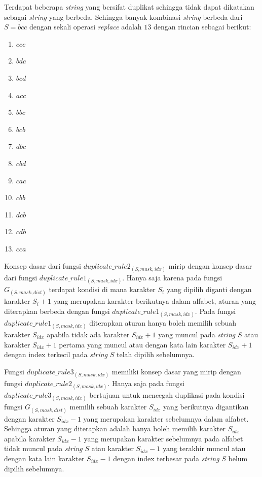 Terdapat beberapa \textit{string} yang bersifat duplikat sehingga tidak dapat dikatakan sebagai \textit{string} yang berbeda. Sehingga banyak kombinasi \textit{string} berbeda dari $ S=bcc $ dengan sekali operasi \textit{replace} adalah $ 13 $ dengan rincian sebagai berikut:
\begin{enumerate}
	\item $ ccc $
	\item $ bdc $
	\item $ bcd $
	\item $ acc $
	\item $ bbc $
	\item $ bcb $	
	\item $ dbc $	
	\item $ cbd $
	\item $ cac $
	\item $ cbb $	
	\item $ dcb $
	\item $ cdb $	
	\item $ cca $
\end{enumerate}

Konsep dasar dari fungsi $ duplicate\_rule2_{(S, mask, idx)} $ mirip dengan konsep dasar dari fungsi $ duplicate\_rule1_{(S, mask, idx)} $. Hanya saja karena pada fungsi $ G_{(S, mask, dist)} $ terdapat kondisi di mana karakter $ S_{i} $ yang dipilih diganti dengan karakter $ S_{i}+1 $ yang merupakan karakter berikutnya dalam alfabet, aturan yang diterapkan berbeda dengan fungsi $ duplicate\_rule1_{(S, mask, idx)} $. Pada fungsi $ duplicate\_rule1_{(S, mask, idx)} $ diterapkan aturan hanya boleh memilih sebuah karakter $ S_{idx} $ apabila tidak ada karakter $ S_{idx}+1 $ yang muncul pada \textit{string} $ S $ atau karakter $ S_{idx}+1 $ pertama yang muncul atau dengan kata lain karakter $ S_{idx}+1 $ dengan index terkecil pada \textit{string} $ S $ telah dipilih sebelumnya.

Fungsi $ duplicate\_rule3_{(S, mask, idx)} $ memiliki konsep dasar yang mirip dengan fungsi $ duplicate\_rule2_{(S, mask, idx)} $. Hanya saja pada fungsi $ duplicate\_rule3_{(S, mask, idx)} $ bertujuan untuk mencegah duplikasi pada kondisi fungsi $ G_{(S, mask, dist)} $ memilih sebuah karakter $ S_{idx} $ yang berikutnya digantikan dengan karakter $ S_{idx}-1 $ yang merupakan karakter sebelumnya dalam alfabet. Sehingga aturan yang diterapkan adalah hanya boleh memilih karakter $ S_{idx} $ apabila karakter $ S_{idx}-1 $ yang merupakan karakter sebelumnya pada alfabet tidak muncul pada \textit{string} $ S $ atau karakter $ S_{idx}-1 $ yang terakhir muncul atau dengan kata lain karakter $ S_{idx}-1 $ dengan index terbesar pada \textit{string} $ S $ belum dipilih sebelumnya.

